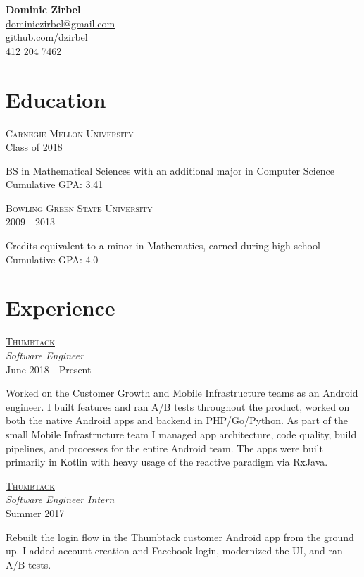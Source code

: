 \documentclass[letterpaper,10pt]{article}
\newcommand{\lb}{\vspace{4pt} \\}
\newenvironment{resumecols2}[2]
{
    \vspace{.1cm}
    \begin{minipage}[t]{.21\linewidth}
        \begin{flushright}
            \textsc{#1} \\
            \small{#2}
        \end{flushright}
    \end{minipage}
    \hspace{.005\linewidth}
    \begin{minipage}[t]{.77\linewidth}
}
{
    \end{minipage}
    \vspace{.1cm}
}
\newenvironment{resumecols}[4]
{
    \vspace{.1cm}
    \begin{minipage}[t]{.21\linewidth}
        \begin{flushright}
            \href{#2}{\textsc{#1}} \\
            \small{\textit{#3}} \\
            \small{#4}
        \end{flushright}
    \end{minipage}
    \hspace{.005\linewidth}
    \begin{minipage}[t]{.77\linewidth}
}
{
    \end{minipage}
    \vspace{.1cm}
}
\begin{document}
\thispagestyle{empty}

\begin{flushright}
    \textbf{\Large{Dominic Zirbel}} \\
    \href{mailto:dominiczirbel@gmail.com}{dominiczirbel@gmail.com} \\
    \href{https://github.com/dzirbel}{github.com/dzirbel} \\
    412 204 7462
\end{flushright}

\section{Education}

\begin{resumecols2}{Carnegie Mellon University}{Class of 2018}
    BS in Mathematical Sciences with an additional major in Computer Science
    \lb
    Cumulative GPA: 3.41
\end{resumecols2}

\begin{resumecols2}{Bowling Green State University}{2009 - 2013}
    Credits equivalent to a minor in Mathematics, earned during high school
    \lb
    Cumulative GPA: 4.0
\end{resumecols2}

\section{Experience}

\begin{resumecols}{Thumbtack}{https://www.thumbtack.com/about}{Software Engineer}{June 2018 - Present}
    Worked on the Customer Growth and Mobile Infrastructure teams as an Android engineer. I built features and ran A/B tests throughout the product, worked on both the native Android apps and backend in PHP/Go/Python. As part of the small Mobile Infrastructure team I managed app architecture, code quality, build pipelines, and processes for the entire Android team. The apps were built primarily in Kotlin with heavy usage of the reactive paradigm via RxJava.
\end{resumecols}

\begin{resumecols}{Thumbtack}{https://www.thumbtack.com/about}{Software Engineer Intern}{Summer 2017}
    Rebuilt the login flow in the Thumbtack customer Android app from the ground up. I added account creation and Facebook login, modernized the UI, and ran A/B tests.
\end{resumecols}
\end{document}
